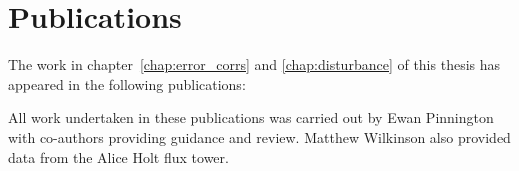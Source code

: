 \chapter*{\centering \Large \vspace{-20mm}\Huge Publications}


\nobibliography*

The work in chapter~\ref{chap:error_corrs} and \ref{chap:disturbance} of this thesis has appeared in the following publications:



All work undertaken in these publications was carried out by Ewan Pinnington with co-authors providing guidance and review. Matthew Wilkinson also provided data from the Alice Holt flux tower.
